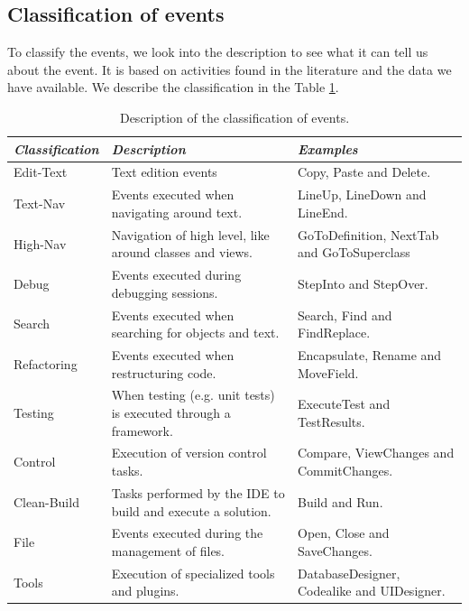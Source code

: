 \documentclass[conference]{IEEEtran}
\begin{document}
\subsection{Classification of events}
To classify the events, we look into the description to see what it can tell us about the event. It is based on activities found in the literature and the data we have available. We describe the classification in the Table \ref{tbl:detailed_events}.

\begin{table}[ht!]
	\caption{Description of the classification of events. }
	\label{tbl:detailed_events}
	\centering
	\begin{tabular}{|p{2cm}|p{6cm}|p{5.5cm}|} 
		\hline 
		\emph{Classification} & \emph{Description} & \emph{Examples} \\  
		\hline 
		\hline 
		Edit-Text &  Text edition events & Copy, Paste and Delete. \\
		\hline
		Text-Nav & Events executed when navigating around text. & LineUp, LineDown and LineEnd.  \\
		\hline
		High-Nav & Navigation of high level, like around classes and views. & GoToDefinition, NextTab and GoToSuperclass \\
		\hline
		Debug & Events executed during debugging sessions. & StepInto and StepOver. \\
		\hline
		Search & Events executed when searching for objects and text. & Search, Find and FindReplace. \\
		\hline
		Refactoring & Events executed when restructuring code. & Encapsulate, Rename and MoveField. \\
		\hline
		Testing & When testing (e.g. unit tests) is executed through a framework. & ExecuteTest and TestResults. \\
		\hline
		Control & Execution of version control tasks. & Compare, ViewChanges and CommitChanges. \\
		\hline
		Clean-Build & Tasks performed by the IDE to build and execute a solution.  & Build and Run. \\
		\hline
		File & Events executed during the management of files. & Open, Close and SaveChanges. \\
		\hline
		Tools & Execution of specialized tools and plugins. & DatabaseDesigner, Codealike and UIDesigner.\\
		\hline
	\end{tabular}
	
\end{table}
\end{document}
